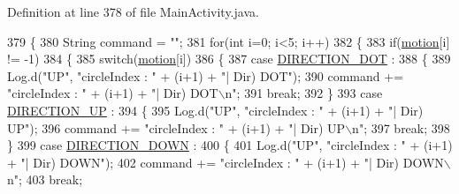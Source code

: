 Definition at line 378 of file Main\+Activity.\+java.


\begin{DoxyCode}
379         \{
380             String command = \textcolor{stringliteral}{""};
381             \textcolor{keywordflow}{for}(\textcolor{keywordtype}{int} i=0; i<5; i++)
382             \{
383                 \textcolor{keywordflow}{if}(\hyperlink{classcom_1_1example_1_1multitouchsample_1_1_main_activity_1_1_my_view_a3e8186596771c2fae1397b496be41230}{motion}[i] != -1)
384                 \{
385                     \textcolor{keywordflow}{switch}(\hyperlink{classcom_1_1example_1_1multitouchsample_1_1_main_activity_1_1_my_view_a3e8186596771c2fae1397b496be41230}{motion}[i])
386                     \{
387                         \textcolor{keywordflow}{case} \hyperlink{classcom_1_1example_1_1multitouchsample_1_1_main_activity_1_1_my_view_ad91938a7ac9667ccd247a072f338a2de}{DIRECTION\_DOT} :
388                         \{
389                             Log.d(\textcolor{stringliteral}{"UP"}, \textcolor{stringliteral}{"circleIndex : "} + (i+1) + \textcolor{stringliteral}{"| Dir) DOT"});
390                             command += \textcolor{stringliteral}{"circleIndex : "} + (i+1) + \textcolor{stringliteral}{"| Dir) DOT\(\backslash\)n"};
391                             \textcolor{keywordflow}{break};
392                         \}
393                         \textcolor{keywordflow}{case} \hyperlink{classcom_1_1example_1_1multitouchsample_1_1_main_activity_1_1_my_view_a43c4159b9b295cfea731211ac614fc0b}{DIRECTION\_UP} :
394                         \{
395                             Log.d(\textcolor{stringliteral}{"UP"}, \textcolor{stringliteral}{"circleIndex : "} + (i+1) + \textcolor{stringliteral}{"| Dir) UP"});
396                             command += \textcolor{stringliteral}{"circleIndex : "} + (i+1) + \textcolor{stringliteral}{"| Dir) UP\(\backslash\)n"};
397                             \textcolor{keywordflow}{break};
398                         \}
399                         \textcolor{keywordflow}{case} \hyperlink{classcom_1_1example_1_1multitouchsample_1_1_main_activity_1_1_my_view_afc3ae0a948391b36141f78c515622217}{DIRECTION\_DOWN} :
400                         \{
401                             Log.d(\textcolor{stringliteral}{"UP"}, \textcolor{stringliteral}{"circleIndex : "} + (i+1) + \textcolor{stringliteral}{"| Dir) DOWN"});
402                             command += \textcolor{stringliteral}{"circleIndex : "} + (i+1) + \textcolor{stringliteral}{"| Dir) DOWN\(\backslash\)n"};
403                             \textcolor{keywordflow}{break};

\end{DoxyCode}
